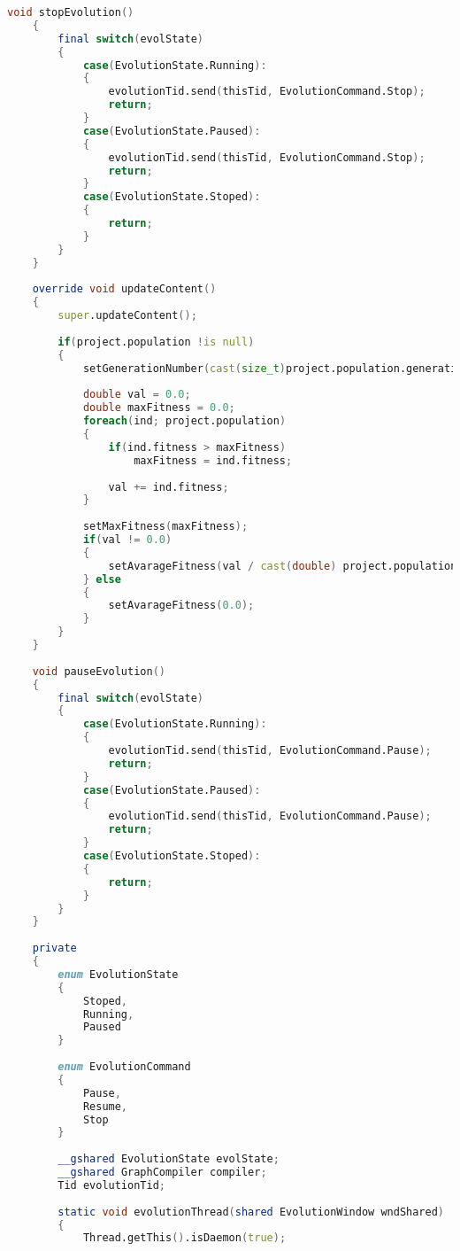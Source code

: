 \documentclass[russian,utf8,emptystyle]{eskdtext}
\begin{document}
\begin{lstlisting}[language=D]
    void stopEvolution()
    {
        final switch(evolState)
        {
            case(EvolutionState.Running):
            {
                evolutionTid.send(thisTid, EvolutionCommand.Stop);
                return;
            }
            case(EvolutionState.Paused):
            {
                evolutionTid.send(thisTid, EvolutionCommand.Stop);
                return;
            }
            case(EvolutionState.Stoped):
            {
                return;
            }
        }
    }
    
    override void updateContent()
    {
        super.updateContent();
        
        if(project.population !is null)
        {
            setGenerationNumber(cast(size_t)project.population.generation);
            
            double val = 0.0;
            double maxFitness = 0.0;
            foreach(ind; project.population)
            {
                if(ind.fitness > maxFitness)
                    maxFitness = ind.fitness;
                    
                val += ind.fitness;
            }
            
            setMaxFitness(maxFitness);
            if(val != 0.0)
            {
                setAvarageFitness(val / cast(double) project.population.length);
            } else
            {
                setAvarageFitness(0.0);
            }
        }
    }
    
    void pauseEvolution()
    {
        final switch(evolState)
        {
            case(EvolutionState.Running):
            {
                evolutionTid.send(thisTid, EvolutionCommand.Pause);
                return;
            }
            case(EvolutionState.Paused):
            {
                evolutionTid.send(thisTid, EvolutionCommand.Pause);
                return;
            }
            case(EvolutionState.Stoped):
            {
                return;
            }
        }
    }
    
    private
    {
        enum EvolutionState
        {
            Stoped,
            Running,
            Paused
        }
        
        enum EvolutionCommand
        {
            Pause,
            Resume,
            Stop
        }
        
        __gshared EvolutionState evolState;
        __gshared GraphCompiler compiler;
        Tid evolutionTid;
        
        static void evolutionThread(shared EvolutionWindow wndShared)
        {
            Thread.getThis().isDaemon(true);
            

\end{lstlisting}
\end{document}
